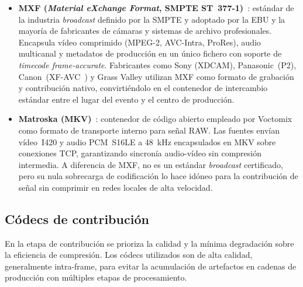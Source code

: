 \begin{itemize}
  \item \textbf{MXF (\textit{Material eXchange Format}, SMPTE ST~377-1)}~\cite{smpte_mxf}:
  estándar de la industria \textit{broadcast} definido por la SMPTE y adoptado por la \ac{EBU} y la
  mayoría de fabricantes de cámaras y sistemas de archivo profesionales. Encapsula
  vídeo comprimido (\ac{MPEG}-2, AVC-Intra, ProRes), audio multicanal y metadatos de
  producción en un único fichero con soporte de \textit{timecode frame-accurate}.
  Fabricantes como Sony (XDCAM), Panasonic~(P2), Canon~(XF-AVC~\cite{canon_xf_avc}) y Grass Valley
  utilizan MXF como formato de grabación y contribución nativo, convirtiéndolo en el
  contenedor de intercambio estándar entre el lugar del evento y el centro de producción.

  \item \textbf{Matroska (MKV)}~\cite{matroska_spec}: contenedor de código abierto
  empleado por Voctomix como formato de transporte interno para señal RAW. Las fuentes
  envían vídeo~I420 y audio PCM~S16LE a 48~kHz encapsulados en MKV sobre conexiones
  TCP, garantizando sincronía audio-vídeo sin compresión intermedia. A diferencia de
  MXF, no es un estándar \textit{broadcast} certificado, pero su nula sobrecarga de codificación
  lo hace idóneo para la contribución de señal sin comprimir en redes locales de alta
  velocidad.
\end{itemize}

\subsection{Códecs de contribución}

En la etapa de contribución se prioriza la calidad y la mínima degradación sobre la
eficiencia de compresión. Los códecs utilizados son de alta calidad, generalmente
intra-frame, para evitar la acumulación de artefactos en cadenas de producción con
múltiples etapas de procesamiento.

